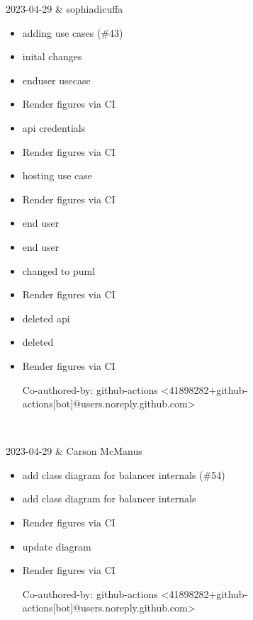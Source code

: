 2023-04-29 & sophiadicuffa
\begin{itemize}[topsep=0pt,itemsep=0pt,parsep=0pt,partopsep=0pt,leftmargin=12pt]
\item adding use cases (\#43)

\item inital changes

\item enduser usecase

\item Render figures via CI

\item api credentials

\item Render figures via CI

\item hosting use case

\item Render figures via CI

\item end user

\item end user

\item changed to puml

\item Render figures via CI

\item deleted api

\item deleted

\item Render figures via CI



Co-authored-by: github-actions <41898282+github-actions[bot]@users.noreply.github.com>
\end{itemize}
\\ \hline

2023-04-29 & Carson McManus
\begin{itemize}[topsep=0pt,itemsep=0pt,parsep=0pt,partopsep=0pt,leftmargin=12pt]
\item add class diagram for balancer internals (\#54)

\item add class diagram for balancer internals

\item Render figures via CI

\item update diagram

\item Render figures via CI



Co-authored-by: github-actions <41898282+github-actions[bot]@users.noreply.github.com>
\end{itemize}
\\ \hline
